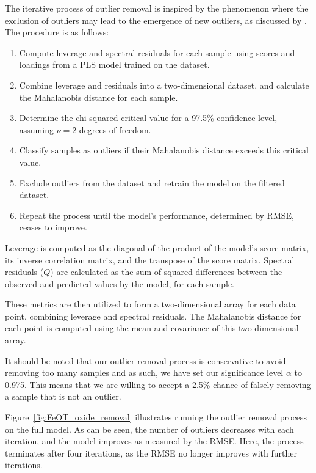 The iterative process of outlier removal is inspired by the phenomenon where the exclusion of outliers may lead to the emergence of new outliers, as discussed by \citet{cleggRecalibrationMarsScience2017}.
The procedure is as follows:
\begin{enumerate}
\item Compute leverage and spectral residuals for each sample using scores and loadings from a PLS model trained on the dataset.
\item Combine leverage and residuals into a two-dimensional dataset, and calculate the Mahalanobis distance for each sample.
\item Determine the chi-squared critical value for a 97.5\% confidence level, assuming $\nu = 2$ degrees of freedom.
\item Classify samples as outliers if their Mahalanobis distance exceeds this critical value.
\item Exclude outliers from the dataset and retrain the model on the filtered dataset.
\item Repeat the process until the model's performance, determined by RMSE, ceases to improve.
\end{enumerate}

Leverage is computed as the diagonal of the product of the model's score matrix, its inverse correlation matrix, and the transpose of the score matrix.
Spectral residuals ($Q$) are calculated as the sum of squared differences between the observed and predicted values by the model, for each sample.

These metrics are then utilized to form a two-dimensional array for each data point, combining leverage and spectral residuals.
The Mahalanobis distance for each point is computed using the mean and covariance of this two-dimensional array.

It should be noted that our outlier removal process is conservative to avoid removing too many samples and as such, we have set our significance level $\alpha$ to 0.975.
This means that we are willing to accept a 2.5\% chance of falsely removing a sample that is not an outlier.

Figure~\ref{fig:FeOT_oxide_removal} illustrates running the outlier removal process on the  full model.
As can be seen, the number of outliers decreases with each iteration, and the model improves as measured by the RMSE.
Here, the process terminates after four iterations, as the RMSE no longer improves with further iterations.

